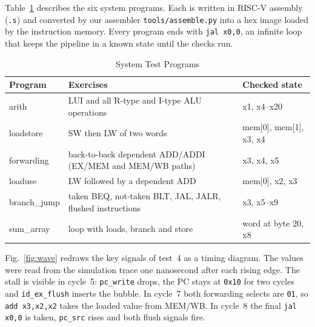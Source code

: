 Table~\ref{tab:programs} describes the six system programs. Each is written in RISC-V
assembly (\texttt{.s}) and converted by our assembler \texttt{tools/assemble.py} into a hex image loaded by the instruction
memory. Every program ends with \texttt{jal x0,0}, an infinite loop that keeps the
pipeline in a known state until the checks run.

\begin{table}[!t]
\centering
\caption{System Test Programs}
\label{tab:programs}
\setlength{\tabcolsep}{3pt}
\renewcommand{\arraystretch}{1.08}
\begin{tabular}{@{}>{\raggedright\arraybackslash}p{1.6cm}>{\raggedright\arraybackslash}p{3.7cm}>{\raggedright\arraybackslash}p{2.3cm}@{}}
\toprule
\textbf{Program} & \textbf{Exercises} & \textbf{Checked state} \\ \midrule
1 arith    & LUI and all R-type and I-type ALU operations & x1, x4--x20 \\
2 loadstore & SW then LW of two words     & mem[0], mem[1], x3, x4 \\
3 forwarding & back-to-back dependent ADD/ADDI (EX/MEM and MEM/WB paths) & x3, x4, x5 \\
4 loaduse  & LW followed by a dependent ADD & mem[0], x2, x3 \\
5 branch\_jump & taken BEQ, not-taken BLT, JAL, JALR, flushed instructions & x3, x5--x9 \\
6 sum\_array & loop with loads, branch and store & word at byte 20, x8 \\ \bottomrule
\end{tabular}
\end{table}

Fig.~\ref{fig:wave} redraws the key signals of test~4 as a timing diagram. The values were
read from the simulation trace one nanosecond after each rising edge. The stall is visible
in cycle~5: \texttt{pc\_write} drops, the PC stays at \texttt{0x10} for two cycles and
\texttt{id\_ex\_flush} inserts the bubble. In cycle~7 both forwarding selects are
\texttt{01}, so \texttt{add x3,x2,x2} takes the loaded value from MEM/WB. In cycle~8 the
final \texttt{jal x0,0} is taken, \texttt{pc\_src} rises and both flush signals fire.

